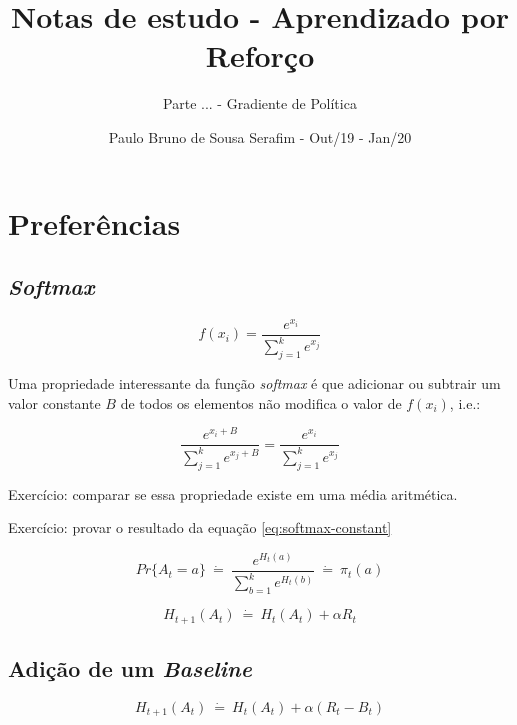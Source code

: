 \documentclass{article}
\title{Notas de estudo - Aprendizado por Reforço}
\author{Parte ...  - Gradiente de Política}
\date{Paulo Bruno de Sousa Serafim - Out/19 - Jan/20}
\begin{document}
\maketitle

    \section{Preferências}
    
        \subsection{\emph{Softmax}}
            
            \begin{equation}
                f(x_i) = \frac{e^{x_i}}{\sum_{j=1}^{k}e^{x_j}}
            \end{equation}
        
            Uma propriedade interessante da função \emph{softmax} é que adicionar ou subtrair um valor constante $B$ de todos os elementos não modifica o valor de $f(x_i)$, i.e.:
            
            \begin{equation}
            \label{eq:softmax-constant}
                \frac{e^{x_i + B}}{\sum_{j=1}^{k}e^{x_j + B}} = \frac{e^{x_i}}{\sum_{j=1}^{k}e^{x_j}}
            \end{equation}
        
            Exercício: comparar se essa propriedade existe em uma média aritmética.
            
            Exercício: provar o resultado da equação \eqref{eq:softmax-constant}
    
            \begin{equation}
                Pr\{A_t=a\} \ \dot{=} \  \frac{e^{H_t(a)}}{\sum_{b=1}^{k}e^{H_t(b)}} \ \dot{=} \ \pi_t(a)
            \end{equation}
        
            \begin{equation}
                H_{t+1}(A_t) \ \dot{=} \ H_t(A_t) + \alpha R_t
            \end{equation}
    
        \subsection{Adição de um \emph{Baseline}}
        
            \begin{equation}
                H_{t+1}(A_t) \ \dot{=} \ H_t(A_t) + \alpha (R_t - B_t)
            \end{equation}
        
\end{document}
